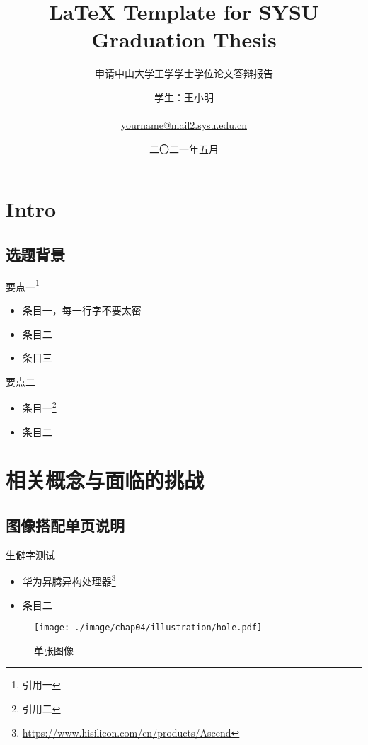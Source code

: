 \documentclass[
    fontset=fandol,
    xcolor=x11names %
]{ctexbeamer}
\title{{\LaTeX} Template for SYSU Graduation Thesis}
\subtitle{申请中山大学工学学士学位论文答辩报告}
\author[王小明]{
    \texorpdfstring{
        学生：王小明\\
        ~\\
        \href{mailto:yourname@mail2.sysu.edu.cn}{yourname@mail2.sysu.edu.cn}
    }{PDF Bookmark Version}
}
\institute[中山大学~计算机学院（软件学院）]{
    \texttt{[image: ./image/template/logo.png]}
}
\date{
    二〇二一年五月
}
\begin{document}
\section{Intro}

\begin{frame}

    \titlepage

\end{frame}

\subsection{选题背景}

\begin{frame}

    \begin{block}{要点一\footnote{引用一}}
        \begin{itemize}
            \item 条目一，每一行字不要太密
            \item 条目二
            \item 条目三
        \end{itemize}
    \end{block}

    \begin{block}{要点二}
        \begin{itemize}
            \item 条目一\footnote{引用二}
            \item 条目二
        \end{itemize}
    \end{block}

\end{frame}

\section{相关概念与面临的挑战}

\subsection{图像搭配单页说明}

\begin{frame}

    \begin{block}{生僻字测试}
        \begin{itemize}
            \item 华为昇腾异构处理器\footnote{\url{https://www.hisilicon.com/cn/products/Ascend}}
            \item 条目二
        \end{itemize}
    \end{block}

    \begin{figure}
        \texttt{[image: ./image/chap04/illustration/hole.pdf]}
        \caption{单张图像}
        \label{fig:hole}
    \end{figure}

\end{frame}
\end{document}
